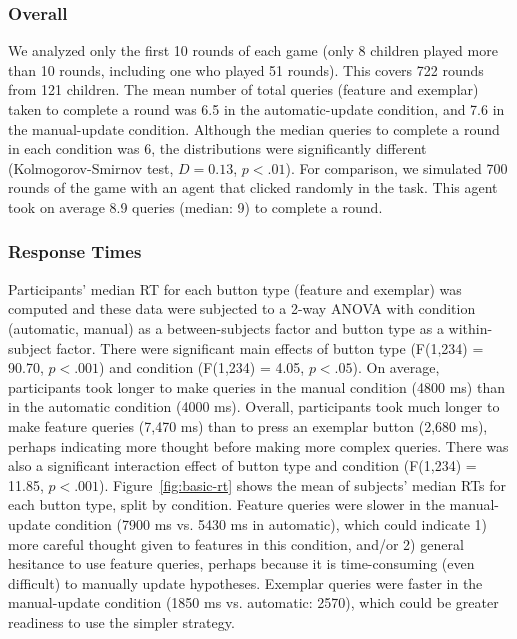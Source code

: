 \documentclass[10pt,letterpaper]{article}
\begin{document}
\subsubsection{Overall}

We analyzed only the first 10 rounds of each game (only 8 children played more than 
10 rounds, including one who played 51 rounds). This covers 722 rounds from 121 
children. The mean number of total queries (feature and exemplar) taken to complete a round was 6.5 in the automatic-update condition, 
and 7.6 in the manual-update condition. Although the median queries to complete a round in each 
condition was 6, the distributions were significantly different (Kolmogorov-Smirnov test, $D = 
0.13$, $p<.01$). For comparison, we simulated 700 rounds of the game with an agent that clicked
randomly in the task.  This agent took on average 8.9 queries (median: 9) to complete a
round.  %

\subsubsection{Response Times}

Participants' median RT for each button type (feature and exemplar) was computed and these data were subjected to a 2-way ANOVA with condition (automatic, manual) as a 
between-subjects factor and button type as a within-subject factor. There
were significant main effects of button type (F(1,234) = 90.70, $p<.
001$) and condition (F(1,234) = 4.05, $p<.05$). On average, participants took longer to make queries in the manual condition (4800 ms) than in the automatic condition (4000 ms). Overall, participants took much longer to 
make feature queries (7,470 ms) than to press an exemplar button (2,680 ms), 
perhaps indicating more thought before making more complex queries. There was also a significant 
interaction effect of button type and condition (F(1,234) = 11.85, $p<.001$). Figure~\ref{fig:basic-rt} shows the mean of subjects' median RTs for each button type, split by condition. Feature queries were 
slower in the manual-update condition (7900 ms vs. 5430 ms in automatic), which could indicate 1) more careful thought given to features in this condition, and/or 2) general hesitance to use feature 
queries, perhaps because it is time-consuming (even difficult) to manually update 
hypotheses. Exemplar queries were faster in the manual-update condition (1850 ms vs. automatic: 2570),
which could be greater readiness to use the simpler strategy.
\end{document}
